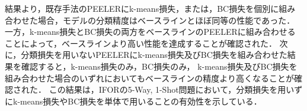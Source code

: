 結果より，既存手法のPEELERにk-means損失，または，BC損失を個別に組み合わせた場合，モデルの分類精度はベースラインとほぼ同等の性能であった．
一方，k-means損失とBC損失の両方をベースラインのPEELERに組み合わせることによって，ベースラインより高い性能を達成することが確認された．
次に，分類損失を用いないPEELERにk-means損失及びBC損失を組み合わせた結果を確認すると，k-means損失のみ，BC損失のみ，
k-means損失及びBC損失を組み合わせた場合のいずれにおいてもベースラインの精度より高くなることが確認された．
この結果は，IFORの5-Way, 1-Shot問題において，分類損失を用いずにk-means損失やBC損失を単体で用いることの有効性を示している．


